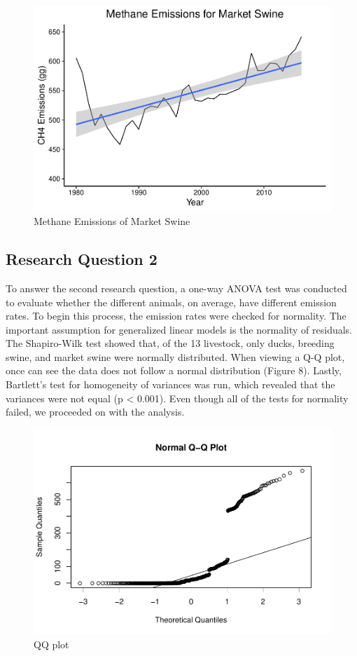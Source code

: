 \documentclass[
  12pt,
]{article}
\begin{document}
\begin{figure}
\centering
\includegraphics{SultzerSwit_ENV872_Project_files/figure-latex/market.swine.ts-1.pdf}
\caption{Methane Emissions of Market Swine}
\end{figure}

\hypertarget{research-question-2}{%
\subsection{Research Question 2}\label{research-question-2}}

To answer the second research question, a one-way ANOVA test was
conducted to evaluate whether the different animals, on average, have
different emission rates. To begin this process, the emission rates were
checked for normality. The important assumption for generalized linear
models is the normality of residuals. The Shapiro-Wilk test showed that,
of the 13 livestock, only ducks, breeding swine, and market swine were
normally distributed. When viewing a Q-Q plot, once can see the data
does not follow a normal distribution (Figure 8). Lastly, Bartlett's
test for homogeneity of variances was run, which revealed that the
variances were not equal (p \textless{} 0.001). Even though all of the
tests for normality failed, we proceeded on with the analysis.

\begin{figure}
\centering
\includegraphics{SultzerSwit_ENV872_Project_files/figure-latex/unnamed-chunk-4-1.pdf}
\caption{QQ plot}
\end{figure}
\end{document}
